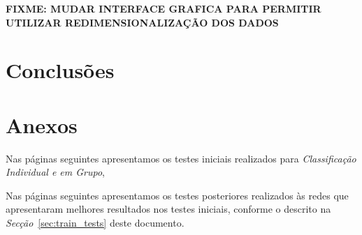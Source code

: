 \documentclass{article}
\begin{document}
\textbf{FIXME: MUDAR INTERFACE GRAFICA PARA PERMITIR UTILIZAR REDIMENSIONALIZAÇÃO DOS DADOS}


\pagebreak

\section{Conclusões}


\pagebreak

\section{Anexos}

Nas páginas seguintes apresentamos os testes iniciais realizados para \emph{Classificação Individual e em Grupo}, 



Nas páginas seguintes apresentamos os testes posteriores realizados às redes que apresentaram melhores resultados nos testes iniciais, conforme o descrito na \emph{Secção}~\ref{sec:train_tests} deste documento.
\end{document}
